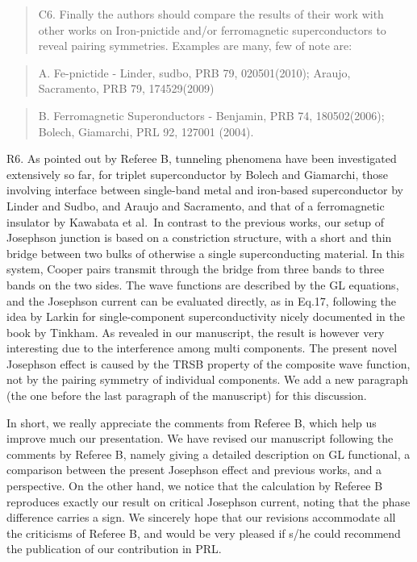 \documentclass[11pt]{article}
\begin{document}
\begin{quote}
C6. Finally the authors should compare the results of their work with
other works on Iron-pnictide and/or ferromagnetic superconductors to
reveal pairing symmetries. Examples are many, few of note are:
\end{quote}

\begin{quote}
A. Fe-pnictide - Linder, sudbo, PRB 79, 020501(2010); Araujo,
Sacramento, PRB 79, 174529(2009)
\end{quote}

\begin{quote}
B. Ferromagnetic Superonductors - Benjamin, PRB 74, 180502(2006);
Bolech, Giamarchi, PRL 92, 127001 (2004).
\end{quote}

R6. As pointed out by Referee B, tunneling phenomena have been
investigated extensively so far, for triplet superconductor by Bolech
and Giamarchi, those involving interface between single-band metal and
iron-based superconductor by Linder and Sudbo, and Araujo and
Sacramento, and that of a ferromagnetic insulator by Kawabata et al.~In
contrast to the previous works, our setup of Josephson junction is based
on a constriction structure, with a short and thin bridge between two
bulks of otherwise a single superconducting material. In this system,
Cooper pairs transmit through the bridge from three bands to three bands
on the two sides. The wave functions are described by the GL equations,
and the Josephson current can be evaluated directly, as in Eq.17,
following the idea by Larkin for single-component superconductivity
nicely documented in the book by Tinkham. As revealed in our manuscript,
the result is however very interesting due to the interference among
multi components. The present novel Josephson effect is caused by the
TRSB property of the composite wave function, not by the pairing
symmetry of individual components. We add a new paragraph (the one
before the last paragraph of the manuscript) for this discussion.

In short, we really appreciate the comments from Referee B, which help
us improve much our presentation. We have revised our manuscript
following the comments by Referee B, namely giving a detailed
description on GL functional, a comparison between the present Josephson
effect and previous works, and a perspective. On the other hand, we
notice that the calculation by Referee B reproduces exactly our result
on critical Josephson current, noting that the phase difference carries
a sign. We sincerely hope that our revisions accommodate all the
criticisms of Referee B, and would be very pleased if s/he could
recommend the publication of our contribution in PRL.
\end{document}
